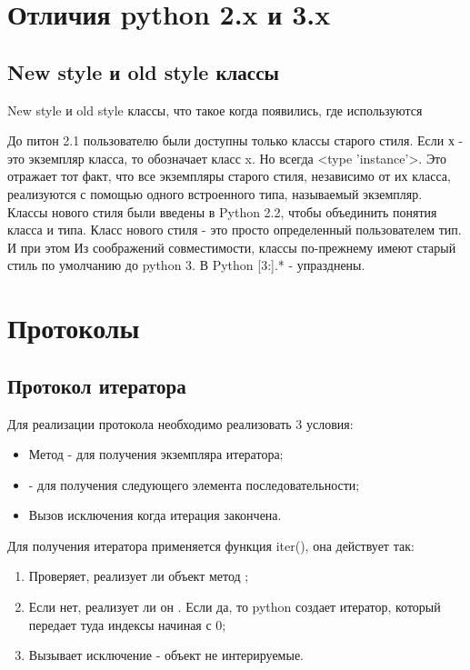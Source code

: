 \section{Отличия python 2.x и 3.x}

\subsection{New style и old style классы}

New style и old style классы, что такое когда появились, где используются

До питон 2.1 пользователю были доступны только классы старого стиля. Если х - это экземпляр класса, то  обозначает класс x. Но  всегда <type 'instance'>. Это отражает тот факт, что все экземпляры старого стиля, независимо от их класса, реализуются с помощью одного встроенного типа, называемый экземпляр.
Классы нового стиля были введены в Python 2.2, чтобы объединить понятия класса и типа. Класс нового стиля - это просто определенный пользователем тип. И при этом 
Из соображений совместимости, классы по-прежнему имеют старый стиль по умолчанию до python 3. В Python [3:].* - упразднены. 

\section{Протоколы}

\subsection{Протокол итератора}

Для реализации протокола необходимо реализовать 3 условия:
\begin{itemize}
    \item Метод  - для получения экземпляра итератора;
    \item {} - для получения следующего элемента последовательности;
    \item Вызов исключения  когда итерация закончена. 
\end{itemize}

Для получения итератора применяется функция iter(), она действует так:
\begin{enumerate}
    \item Проверяет, реализует ли объект метод ; 
    \item Если нет, реализует ли он . Если да, то python создает итератор, который передает туда индексы начиная с 0;
    \item Вызывает исключение - объект не интерируемые.
\end{enumerate}

